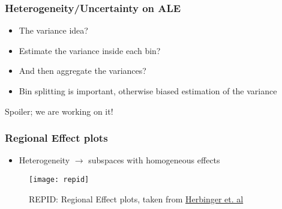 \begin{frame}
  \frametitle{Heterogeneity/Uncertainty on ALE}
  \begin{itemize}
    \item The variance idea?
    \item Estimate the variance inside each bin?
    \item And then aggregate the variances?
    \item Bin splitting is important, otherwise biased estimation of the variance
  \end{itemize}
  \noindent\makebox[\linewidth]{\rule{\paperwidth}{0.4pt}}
  Spoiler; we are working on it!
\end{frame}


\begin{frame}
  \frametitle{Regional Effect plots}
  \begin{itemize}
    \item Heterogeneity $\rightarrow$ subspaces with homogeneous effects
  \end{itemize}

  \begin{figure}
    \centering
    \texttt{[image: repid]}
    \caption{REPID: Regional Effect plots, taken from \href{https://arxiv.org/abs/2202.07254}{Herbinger et. al}}
  \end{figure}
\end{frame}


